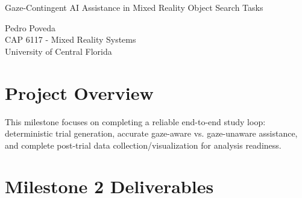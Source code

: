 \documentclass[12pt,letterpaper]{article}
\begin{document}
\begin{center}
{\Huge\bfseries\color{black}{Milestone 2 Project Checklist}}

\vspace{0.5cm}

{\Large Gaze-Contingent AI Assistance in Mixed Reality Object Search Tasks}

\vspace{0.3cm}

{\large Pedro Poveda}\\
{\normalsize CAP 6117 - Mixed Reality Systems}\\
{\normalsize University of Central Florida}

\vspace{0.5cm}
\end{center}

\section{Project Overview}
This milestone focuses on completing a reliable end-to-end study loop: deterministic trial generation, accurate gaze-aware vs. gaze-unaware assistance, and complete post-trial data collection/visualization for analysis readiness.

\section{Milestone 2 Deliverables}
\end{document}
